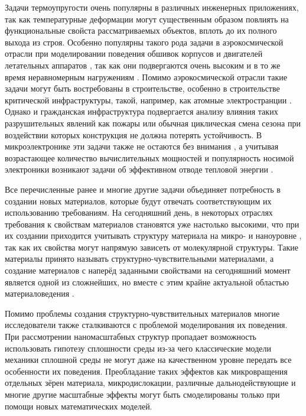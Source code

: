 
{\actuality}
Задачи термоупругости очень популярны в различных инженерных приложениях, так как температурные деформации могут существенным образом повлиять на функциональные свойста рассматриваемых объектов, вплоть до их полного выхода из строя. Особенно популярны такого рода задачи в аэрокосмической отрасли при моделировании поведения обшивок корпусов и двигателей летательных аппаратов \cite{Aerocosmos1, Aerocosmos2, Aerocosmos3}, так как они подвергаются очень высоким и в то же время неравномерным нагружениям \cite{Aerocosmos4, Aerocosmos5, Aerocosmos6, Aerocosmos7}. Помимо аэрокосмической отрасли такие задачи могут быть востребованы в строительстве, особенно в строительстве критической инфраструктуры, такой, например, как атомные электространции \cite{StroyMech1, StroyMech2}. Однако и гражданская инфраструктура подвергается анализу влияния таких разрушительных явлений как пожары \cite{StroyMech3, StroyMech4} или обычная циклическая смена сезона \cite{StroyMech5, StroyMech6} при воздействии которых конструкция не должна потерять устойчивость. В микроэлектронике эти задачи также не остаются без внимания \cite{MicroElectronic1, MicroElectronic2}, а учитывая возрастающее количество вычислительных мощностей и популярность носимой электроники возникают задачи об эффективном отводе тепловой энергии \cite{MicroElectronic3}.

Все перечисленные ранее и многие другие задачи объединяет потребность в создании новых материалов, которые будут отвечать соответствующим их использованию требованиям. На сегодняшний день, в некоторых отраслях требования к свойствам материалов становятся уже настолько высокими, что при их создании приходится учитывать структуру материала на микро- и наноуровне \cite{MaterialStructure1, MaterialStructure2, MaterialStructure3}, так как их свойства могут напрямую зависеть от молекулярной структуры. Такие материалы принято называть структурно-чувствительными материалами, а создание материалов с наперёд заданными свойствами на сегодняшний момент является одной из сложнейших, но вместе с этим крайне актуальной областью материаловедения \cite{Auxetics}.

Помимо проблемы создания структурно-чувствительных материалов многие исследователи также сталкиваются с проблемой моделирования их поведения. При рассмотрении наномасштабных структур пропадает возможность использовать гипотезу сплошности среды из-за чего классические модели механики сплошной среды не могут даже на качественном уровне передать все особенности их поведения. Преобладание таких эффектов как микровращения отдельных зёрен материала, микродислокации, различные дальнодействующие и многие другие масштабные эффекты могут быть смоделированы только при помощи новых математических моделей.

